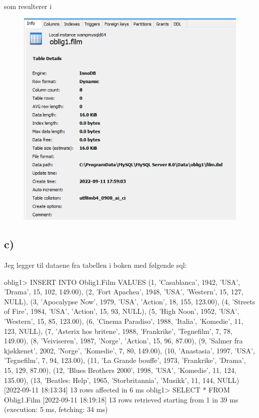 \documentclass[%
notitlepage,
 amsmath,amssymb,
 aps,
rmp,
]{revtex4-2}  %
\begin{document}
\newpage
som resulterer i
\begin{figure}[H]
\centering\includegraphics[scale=1]{op1b.png}
\end{figure}

\subsection*{c)}
Jeg legger til dataene fra tabellen i boken med følgende sql:
\begin{sql}
oblig1> INSERT INTO Oblig1.Film
        VALUES (1, 'Casablanca', 1942, 'USA', 'Drama', 15, 102, 149.00),
               (2, 'Fort Apachea', 1948, 'USA', 'Western', 15, 127, NULL),
               (3, 'Apocalypse Now', 1979, 'USA', 'Action', 18, 155, 123.00),
               (4, 'Streets of Fire', 1984, 'USA', 'Action', 15, 93, NULL),
               (5, 'High Noon', 1952, 'USA', 'Western', 15, 85, 123.00),
               (6, 'Cinema Paradiso', 1988, 'Italia', 'Komedie', 11, 123, NULL),
               (7, 'Asterix hos britene', 1988, 'Frankrike', 'Tegnefilm', 7, 78, 149.00),
               (8, 'Veiviseren', 1987, 'Norge', 'Action', 15, 96, 87.00),
               (9, 'Salmer fra kjøkkenet', 2002, 'Norge', 'Komedie', 7, 80, 149.00),
               (10, 'Anastasia', 1997, 'USA', 'Tegnefilm', 7, 94, 123.00),
               (11, 'La Grande bouffe', 1973, 'Frankrike', 'Drama', 15, 129, 87.00),
               (12, 'Blues Brothers 2000', 1998, 'USA', 'Komedie', 11, 124, 135.00),
               (13, 'Beatles: Help', 1965, 'Storbritannia', 'Musikk', 11, 144, NULL)
[2022-09-11 18:13:34] 13 rows affected in 6 ms
oblig1> SELECT * FROM Oblig1.Film
[2022-09-11 18:19:18] 13 rows retrieved starting from 1 in 39 ms (execution: 5 ms, fetching: 34 ms)
\end{sql}
\end{document}
